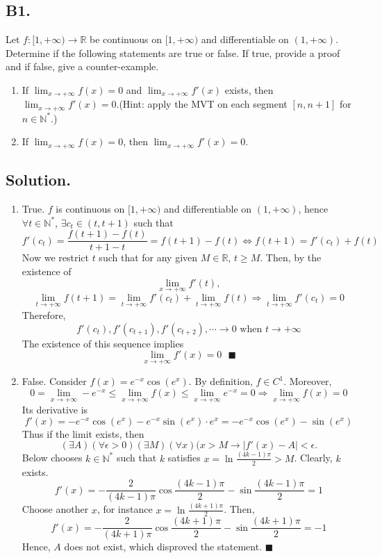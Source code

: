 \documentclass{article}
\begin{document}
\subsection*{B1.}
Let $f:[1,+\infty)\to \mathbb{R}$ be continuous on $[1,+\infty)$ and differentiable on $(1,+\infty)$. Determine if the following statements are true or false. If true, provide a proof and if false, give a counter-example.
\begin{enumerate}
    \item If $\lim_{x\to +\infty} f(x)=0$ and $\lim _{x\to +\infty} f'(x)$ exists, then $\lim_{x\to +\infty} f'(x)=0$.(Hint: apply the MVT on each segment $[n,n+1]$ for $n\in\mathbb{N}^*$.)
    \item If $\lim_{x\to +\infty} f(x)=0$, then $\lim _{x\to +\infty} f'(x)=0$.
\end{enumerate}
\subsection*{Solution.}
\begin{enumerate}
    \item True.\newline 
    $f$ is continuous on $[1,+\infty)$ and differentiable on $(1,+\infty)$, hence $\forall t\in \mathbb{N}^*$, $\exists c_t\in (t,t+1)$ such that 
    \[f'(c_t)=\frac{f(t+1)-f(t)}{t+1-t}=f(t+1)-f(t)\Leftrightarrow f(t+1)=f'(c_t)+f(t)\]
    Now we restrict $t$ such that for any given $M\in \mathbb{R}$, $t\geq M$. Then, by the existence of 
    \[\lim _{x\to +\infty} f'(t),\]
    \[\lim_{t\to+\infty}f(t+1)=\lim_{t\to +\infty}f'(c_t)+\lim _{t\to+\infty} f(t)\Rightarrow \lim _{t\to+\infty} f'(c_t)=0\]
    Therefore, \[f'(c_t),f'(c_{t+1}),f'(c_{t+2}),\cdots \to 0 \text{ when } t\to +\infty\]
    The existence of this sequence implies 
    \[\lim_{x\to+\infty} f'(x)=0 \text{    }\blacksquare\]
    \item False. \newline
    Consider $f(x)=e^{-x}\cos(e^x)$.\newline
    By definition, $f\in C^1$. Moreover,
    \[0=\lim _{x\to+\infty} -e^{-x}\leq \lim _{x\to+\infty} f(x) \leq \lim_{x\to+\infty} e^{-x}=0 \Rightarrow \lim _{x\to+\infty} f(x)=0\]
    Its derivative is
    \[f'(x)=-e^{-x}\cos(e^x)-e^{-x}\sin(e^x)\cdot e^x=-e^{-x}\cos(e^x)-\sin(e^x)\]
    Thus if the limit exists, then 
    \[(\exists A)(\forall \epsilon>0)(\exists M)(\forall x)(x>M\rightarrow |f'(x)-A|<\epsilon.\]
    Below chooses $k\in\mathbb{N}^*$ such that $k$ satisfies 
    $x=\ln{\frac{(4k-1)\pi}{2}}>M$. Clearly, $k$ exists.
    \[f'(x)=-\frac{2}{(4k-1)\pi}\cos\frac{(4k-1)\pi}{2}-\sin\frac{(4k-1)\pi}{2}=1\]
    Choose another $x$, for instance $x=\ln\frac{(4k+1)\pi}{2}$. Then,
    \[f'(x)=-\frac{2}{(4k+1)\pi}\cos\frac{(4k+1)\pi}{2}-\sin\frac{(4k+1)\pi}{2}=-1\]
    Hence, $A$ does not exist, which disproved the statement. $\blacksquare$
\end{enumerate}
\end{document}
